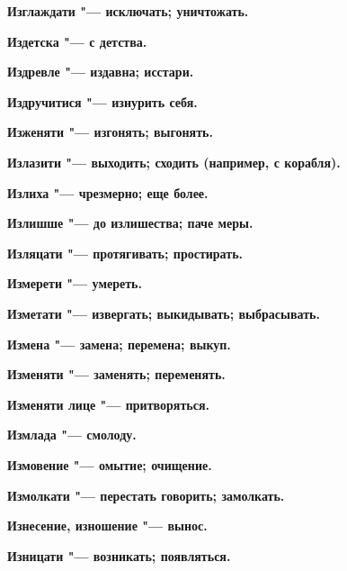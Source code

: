 \begin{mymulticols}{2}
\bfseries Изглаждати\normalfont{} "--- исключать; уничтожать. 




\bfseries Издетска\normalfont{} "--- с детства. 




\bfseries Издревле\normalfont{} "--- издавна; исстари. 




\bfseries Издручитися\normalfont{} "--- изнурить себя. 




\bfseries Изженяти\normalfont{} "--- изгонять; выгонять. 




\bfseries Излазити\normalfont{} "--- выходить; сходить (например, с корабля). 




\bfseries Излиха\normalfont{} "--- чрезмерно; еще более. 




\bfseries Излишше\normalfont{} "--- до излишества; паче меры. 




\bfseries Изляцати\normalfont{} "--- протягивать; простирать. 




\bfseries Измерети\normalfont{} "--- умереть. 




\bfseries Изметати\normalfont{} "--- извергать; выкидывать; выбрасывать. 




\bfseries Измена\normalfont{} "--- замена; перемена; выкуп. 




\bfseries Изменяти\normalfont{} "--- заменять; переменять. 




\bfseries Изменяти лице\normalfont{} "--- притворяться. 




\bfseries Измлада\normalfont{} "--- смолоду. 




\bfseries Измовение\normalfont{} "--- омытие; очищение. 




\bfseries Измолкати\normalfont{} "--- перестать говорить; замолкать. 




\bfseries Изнесение, изношение\normalfont{} "--- вынос. 




\bfseries Изницати\normalfont{} "--- возникать; появляться. 





\end{mymulticols}
